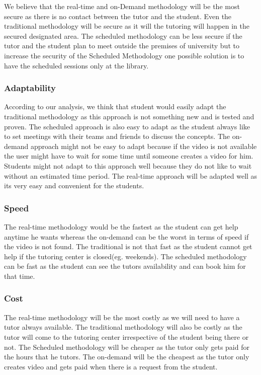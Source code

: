 \documentclass{sig-alternate-05-2015}
\begin{document}
We believe that the real-time and on-Demand methodology will be the most secure as there is no contact between the tutor and the student. Even the traditional methodology will be secure as it will the tutoring will happen in the secured designated area. The scheduled methodology can be less secure if the tutor and the student plan to meet outside the premises of university but to increase the security of the Scheduled Methodology one possible solution is to have the scheduled sessions only at the library.

\subsubsection{Adaptability}

According to our analysis, we think that student would easily adapt the traditional methodology as this approach is not something new and is tested and proven. The scheduled approach is also easy to adapt as the student always like to set meetings with their teams and friends to discuss the concepts. The on-demand approach might not be easy to adapt because if the video is not available the user might have to wait for some time until someone creates a video for him. Students might not adapt to this approach well because they do not like to wait without an estimated time period.  The real-time approach will be adapted well as its very easy and convenient for the students.

\subsubsection{Speed}

The real-time methodology would be the fastest as the student can get help anytime he wants whereas the on-demand can be the worst in terms of speed if the video is not found. The traditional is not that fast as the student cannot get help if the tutoring center is closed(eg. weekends). The scheduled methodology can be fast as the student can see the tutors availability and can book him for that time.

\subsubsection{Cost}

The real-time methodology will be the most costly as we will need to have a tutor always available. The traditional methodology will also be costly as the tutor will come to the tutoring center irrespective of the student being there or not. The Scheduled methodology will be cheaper as the tutor only gets paid for the hours that he tutors. The on-demand will be the cheapest as the tutor only creates video and gets paid when there is a request from the student.
\end{document}
